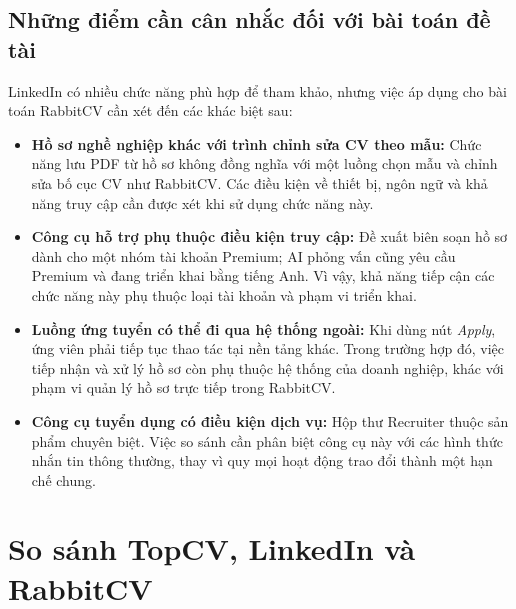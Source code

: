 \subsection{Những điểm cần cân nhắc đối với bài toán đề tài}

LinkedIn có nhiều chức năng phù hợp để tham khảo, nhưng việc áp dụng cho bài toán RabbitCV cần xét đến các khác biệt sau:

\begin{itemize}
    \item \textbf{Hồ sơ nghề nghiệp khác với trình chỉnh sửa CV theo mẫu:} Chức năng lưu PDF từ hồ sơ không đồng nghĩa với một luồng chọn mẫu và chỉnh sửa bố cục CV như RabbitCV. Các điều kiện về thiết bị, ngôn ngữ và khả năng truy cập cần được xét khi sử dụng chức năng này.
    \item \textbf{Công cụ hỗ trợ phụ thuộc điều kiện truy cập:} Đề xuất biên soạn hồ sơ dành cho một nhóm tài khoản Premium; AI phỏng vấn cũng yêu cầu Premium và đang triển khai bằng tiếng Anh. Vì vậy, khả năng tiếp cận các chức năng này phụ thuộc loại tài khoản và phạm vi triển khai.
    \item \textbf{Luồng ứng tuyển có thể đi qua hệ thống ngoài:} Khi dùng nút \textit{Apply}, ứng viên phải tiếp tục thao tác tại nền tảng khác. Trong trường hợp đó, việc tiếp nhận và xử lý hồ sơ còn phụ thuộc hệ thống của doanh nghiệp, khác với phạm vi quản lý hồ sơ trực tiếp trong RabbitCV.
    \item \textbf{Công cụ tuyển dụng có điều kiện dịch vụ:} Hộp thư Recruiter thuộc sản phẩm chuyên biệt. Việc so sánh cần phân biệt công cụ này với các hình thức nhắn tin thông thường, thay vì quy mọi hoạt động trao đổi thành một hạn chế chung.
\end{itemize}
\section{So sánh TopCV, LinkedIn và RabbitCV}
\label{sec:comparison-with-my-system}


